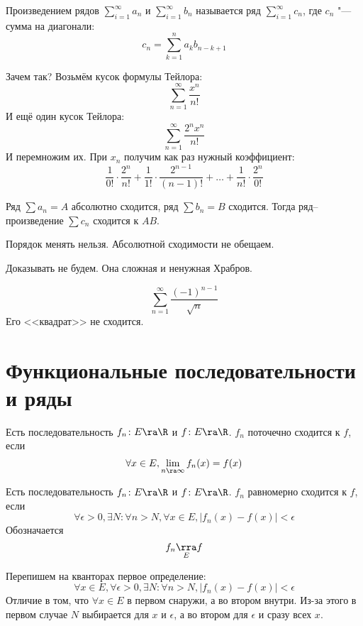 \begin{Def}
	Произведением рядов $\sum_{i=1}^\infty a_n$ и $\sum_{i=1}^\infty b_n$ называется ряд $\sum_{i=1}^\infty c_n$, где $c_n$ "--- сумма на диагонали:
	\[ c_n = \sum_{k=1}^n a_k b_{n-k+1}\]
\end{Def}

\begin{Rem}
	Зачем так?
	Возьмём кусок формулы Тейлора:
	\[ \sum_{n=1}^\infty \frac{x^n}{n!} \]
	И ещё один кусок Тейлора:
	\[ \sum_{n=1}^\infty \frac{2^nx^n}{n!} \]
	И перемножим их.
	При $x_n$ получим как раз нужный коэффициент: 
	\[ \frac{1}{0!} \cdot \frac{2^n}{n!} + \frac{1}{1!} \cdot \frac{2^{n-1}}{(n-1)!} + \dots + \frac{1}{n!}\cdot\frac{2^n}{0!} \]
\end{Rem}

\begin{theorem}[Мертенса]
	Ряд $\sum a_n = A$ абсолютно сходится,
	ряд $\sum b_n = B$ сходится.
	Тогда ряд--произведение $\sum c_n$ сходится к $AB$.
\end{theorem}
\begin{Rem}
	Порядок менять нельзя. Абсолютной сходимости не обещаем.
\end{Rem}

Доказывать не будем. Она сложная и ненужная \textcopyright Храбров.

\begin{Exercise}
	\[ \sum_{n=1}^\infty \frac{(-1)^{n-1}}{\sqrt n} \]
	Его <<квадрат>> не сходится.
\end{Exercise}

\section[Функциональные посл-ти и ряды]{Функциональные последовательности и ряды}

\begin{Def}
	Есть последовательность $f_n \colon E \ra \R$ и $f \colon E \ra \R$.
	$f_n$ поточечно сходится к $f$, если
	\[ \forall x \in E, \lim_{n \ra \infty} f_n(x) = f(x) \]
\end{Def}

\begin{Def}
	Есть последовательность $f_n \colon E \ra \R$ и $f \colon E \ra \R$.
	$f_n$ равномерно сходится к $f$, если
	\[ \forall \epsilon > 0, \exists N\colon \forall n > N, \forall x \in E, |f_n(x) - f(x)| < \epsilon \]
	Обозначается
	\[ f_n \underset{E}\rra f \]
\end{Def}

Перепишем на кванторах первое определение:
\[ \forall x \in E, \forall \epsilon > 0, \exists N\colon \forall n > N, |f_n(x) - f(x)| < \epsilon \]
Отличие в том, что $\forall x \in E$ в первом снаружи, а во втором внутри.
Из-за этого в первом случае $N$ выбирается для $x$ и $\epsilon$, а во втором для $\epsilon$ и сразу всех $x$.

